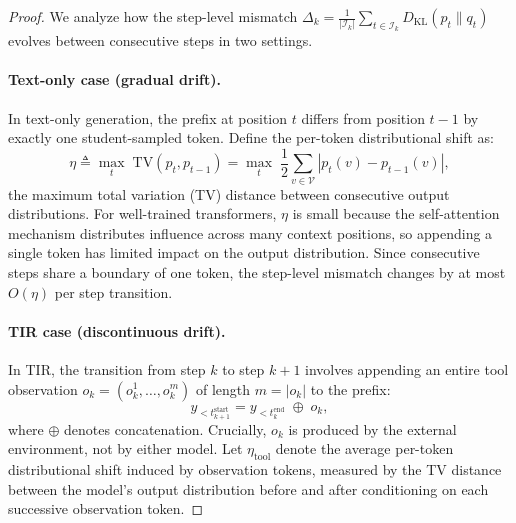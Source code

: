 \begin{proof}
We analyze how the step-level mismatch $\Delta_k = \frac{1}{|\mathcal{I}_k|}\sum_{t \in \mathcal{I}_k} D_{\mathrm{KL}}(p_t \| q_t)$ evolves between consecutive steps in two settings.

\paragraph{Text-only case (gradual drift).}
In text-only generation, the prefix at position $t$ differs from position $t-1$ by exactly one student-sampled token. Define the per-token distributional shift as:
\begin{equation}
    \eta \triangleq \max_t \; \mathrm{TV}(p_t, p_{t-1}) = \max_t \; \frac{1}{2}\sum_{v \in \mathcal{V}}\left|p_t(v) - p_{t-1}(v)\right|,
\end{equation}
\ie the maximum total variation (TV) distance between consecutive output distributions. For well-trained transformers, $\eta$ is small because the self-attention mechanism distributes influence across many context positions, so appending a single token has limited impact on the output distribution. Since consecutive steps share a boundary of one token, the step-level mismatch changes by at most $O(\eta)$ per step transition.

\paragraph{TIR case (discontinuous drift).}
In TIR, the transition from step $k$ to step $k+1$ involves appending an entire tool observation $o_k = (o_k^1, \ldots, o_k^m)$ of length $m = |o_k|$ to the prefix:
\begin{equation}
    y_{<t_{k+1}^{\mathrm{start}}} = y_{<t_k^{\mathrm{end}}} \;\oplus\; o_k,
\end{equation}
where $\oplus$ denotes concatenation. Crucially, $o_k$ is produced by the external environment, not by either model. Let $\eta_{\mathrm{tool}}$ denote the average per-token distributional shift induced by observation tokens, measured by the TV distance between the model's output distribution before and after conditioning on each successive observation token.


\end{proof}
